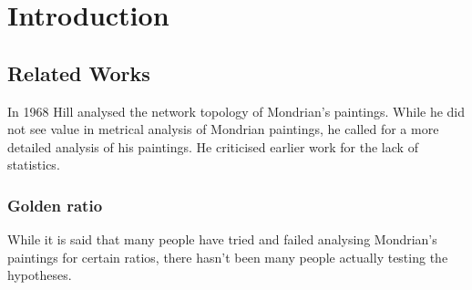 \section{Introduction}






\subsection{Related Works}


In 1968 Hill \cite{Hill1968} analysed the network topology of Mondrian's paintings.
While he did not see value in metrical analysis of Mondrian paintings, he called
for a more detailed analysis of his paintings. He criticised earlier work for
the lack of statistics.

\subsubsection{Golden ratio}

\cite{Livio2002}

While it is said that many people have tried and failed analysing Mondrian's
paintings for certain ratios, there hasn't been many people actually testing
the hypotheses.

